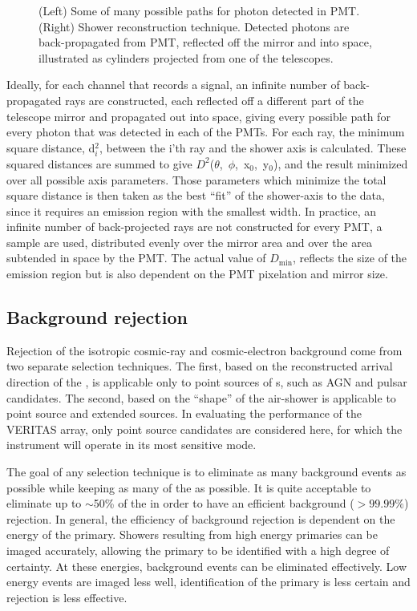 \begin{figure}[p]
\caption{\label{FIG::VERITAS::RECONSTRUCTION3D} (Left) Some of many 
possible paths for \Cerenkov photon detected in PMT. (Right) Shower
reconstruction technique. Detected photons are back-propagated from
PMT, reflected off the mirror and into space, illustrated as cylinders
projected from one of the telescopes.}
\end{figure}

Ideally, for each channel that records a signal, an infinite number of
back-propagated rays are constructed, each reflected off a different
part of the telescope mirror and propagated out into space, giving
every possible path for every \Cerenkov photon that was detected in
each of the PMTs. For each ray, the minimum square distance, d$^2_i$,
between the i'th ray and the shower axis is calculated. These squared
distances are summed to give \mbox{$D^2$($\theta$, $\phi$, x$_0$,
y$_0$)}, and the result minimized over all possible axis
parameters. Those parameters which minimize the total square distance
is then taken as the best ``fit'' of the shower-axis to the data,
since it requires an emission region with the smallest width. In
practice, an infinite number of back-projected rays are not
constructed for every PMT, a sample are used, distributed evenly over
the mirror area and over the area subtended in space by the PMT. The
actual value of $D_{\mathrm{min}}$, reflects the size of the emission
region but is also dependent on the PMT pixelation and mirror size.

\subsection{Background rejection}
\label{SEC::VERITAS::V7REJECTION}

Rejection of the isotropic cosmic-ray and cosmic-electron background
come from two separate selection techniques. The first, based on the
reconstructed arrival direction of the \Grayc, is applicable only to
point sources of {\Grayc}s, such as AGN and pulsar candidates. The
second, based on the ``shape'' of the air-shower is applicable to
point source and extended \Gray sources. In evaluating the performance
of the VERITAS array, only point source candidates are considered
here, for which the instrument will operate in its most sensitive
mode.

The goal of any selection technique is to eliminate as many background
events as possible while keeping as many of the \Grays as possible. It
is quite acceptable to eliminate up to $\sim$50\% of the \Grays in
order to have an efficient background ($>99.99\%$) rejection. In
general, the efficiency of background rejection is dependent on the
energy of the primary.  Showers resulting from high energy primaries
can be imaged accurately, allowing the primary to be identified with a
high degree of certainty. At these energies, background events can be
eliminated effectively. Low energy events are imaged less well,
identification of the primary is less certain and rejection is less
effective.

